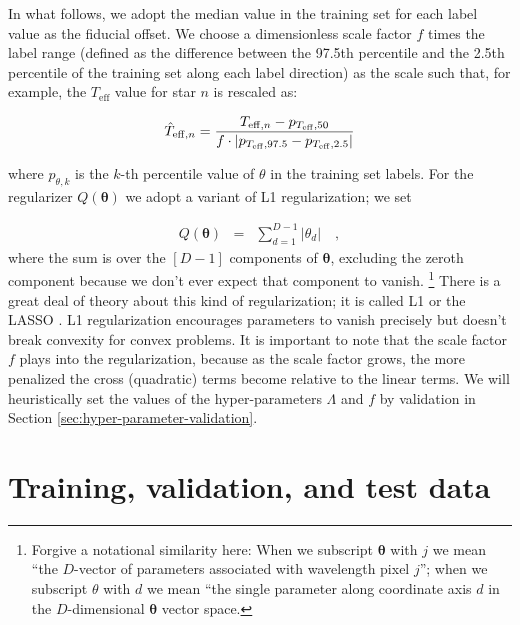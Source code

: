 \documentclass[12pt,preprint]{aastex}
\newcommand{\Teff}{T_{\mathrm{eff}}}
\newcommand{\Dvector}[1]{\boldsymbol{#1}}
\newcommand{\vectheta}{\Dvector{\theta}}
\begin{document}
In what follows, we adopt the median value in the training set for each label 
value as the fiducial offset.  We choose a dimensionless scale factor $f$ 
times the label range (defined as the difference between the 97.5th percentile
and the 2.5th percentile of the training set along each label direction) as 
the scale such that, for example, the $\Teff$ value for star $n$ is rescaled as:

\begin{eqnarray}\label{eq:label-norm}
  \hat{T}_{\mathrm{eff},n} = \frac{T_{{\rm eff},n} - p_{\Teff,50}}{f\cdot|p_{\Teff,97.5} - p_{\Teff,2.5}|}
\end{eqnarray}

\noindent{}where $p_{\theta,k}$ is the $k$-th percentile value of $\theta$ in
the training set labels. For the regularizer $Q(\vectheta)$ we adopt a variant
of L1 regularization; we set

\begin{eqnarray}\label{eq:l1-variant}
  Q(\vectheta) &=& \sum_{d=1}^{D-1} |\theta_d|
  \quad,
\end{eqnarray}
where the sum is over the $[D-1]$ components of $\vectheta$, excluding the 
zeroth component because we don't ever expect that component to vanish.
\footnote{Forgive a notational similarity here: When we subscript $\vectheta$ 
with $j$ we mean ``the $D$-vector of parameters associated with wavelength pixel
$j$''; when we subscript $\theta$ with $d$ we mean ``the single parameter along 
coordinate axis $d$ in the $D$-dimensional $\vectheta$ vector space.} There is
a great deal of theory about this kind of regularization; it is called L1 or the
LASSO \citep{Tibshirani_1996}.  L1 regularization encourages parameters to vanish 
precisely but doesn't break convexity for convex problems.  It is important to
note that the scale factor $f$ plays into the regularization, because as the 
scale factor grows, the more penalized the cross (quadratic) terms become 
relative to the linear terms.  We will heuristically set the values of the hyper-parameters
$\Lambda$ and $f$ by validation in Section \ref{sec:hyper-parameter-validation}.





\section{Training, validation, and test data}
\label{sec:training-set}
\end{document}
